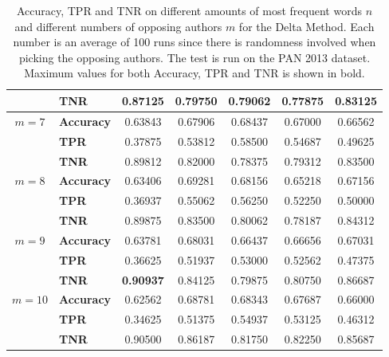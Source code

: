 \begin{table}
\begin{tabular}{c|lccccc}
               & \textbf{TNR}      & 0.87125 & 0.79750 & 0.79062 & 0.77875 & 0.83125 \\
        \hline
        $m=7$  & \textbf{Accuracy} & 0.63843 & 0.67906 & 0.68437 & 0.67000 & 0.66562 \\
               & \textbf{TPR}      & 0.37875 & 0.53812 & 0.58500 & 0.54687 & 0.49625 \\
               & \textbf{TNR}      & 0.89812 & 0.82000 & 0.78375 & 0.79312 & 0.83500 \\
        \hline
        $m=8$  & \textbf{Accuracy} & 0.63406 & 0.69281 & 0.68156 & 0.65218 & 0.67156 \\
               & \textbf{TPR}      & 0.36937 & 0.55062 & 0.56250 & 0.52250 & 0.50000 \\
               & \textbf{TNR}      & 0.89875 & 0.83500 & 0.80062 & 0.78187 & 0.84312 \\
        \hline
        $m=9$  & \textbf{Accuracy} & 0.63781 & 0.68031 & 0.66437 & 0.66656 & 0.67031 \\
               & \textbf{TPR}      & 0.36625 & 0.51937 & 0.53000 & 0.52562 & 0.47375 \\
               & \textbf{TNR}      & \textbf{0.90937} & 0.84125 & 0.79875 & 0.80750 & 0.86687 \\
        \hline
        $m=10$ & \textbf{Accuracy} & 0.62562 & 0.68781 & 0.68343 & 0.67687 & 0.66000 \\
               & \textbf{TPR}      & 0.34625 & 0.51375 & 0.54937 & 0.53125 & 0.46312 \\
               & \textbf{TNR}      & 0.90500 & 0.86187 & 0.81750 & 0.82250 & 0.85687
    \end{tabular}
    \caption{Accuracy, \gls{TPR} and \gls{TNR} on different amounts of most
        frequent words $n$ and different numbers of opposing authors $m$ for the
        Delta Method. Each number is an average of 100 runs since there is
        randomness involved when picking the opposing authors. The test is run
        on the PAN 2013 dataset. Maximum values for both Accuracy, \gls{TPR} and
        \gls{TNR} is shown in bold.}
    \label{fig:delta_pan_2013_res}
\end{table}

